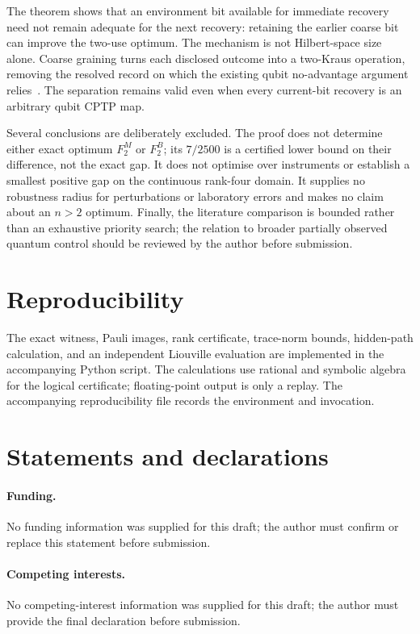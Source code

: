 \documentclass[11pt]{article}
\begin{document}
The theorem shows that an environment bit available for immediate recovery need not
remain adequate for the next recovery: retaining the earlier coarse bit can improve
the two-use optimum.  The mechanism is not Hilbert-space size alone.  Coarse graining
turns each disclosed outcome into a two-Kraus operation, removing the resolved record
on which the existing qubit no-advantage argument relies~\cite{GregorattiWerner2004,RexitiEtAl2024}.
The separation remains valid even when every current-bit recovery is an arbitrary
qubit CPTP map.

Several conclusions are deliberately excluded.  The proof does not determine either
exact optimum $F_2^M$ or $F_2^B$; its $7/2500$ is a certified lower bound on their
difference, not the exact gap.  It does not optimise over instruments or establish a
smallest positive gap on the continuous rank-four domain.  It supplies no robustness
radius for perturbations or laboratory errors and makes no claim about an $n>2$
optimum.  Finally, the literature comparison is bounded rather than an exhaustive
priority search; the relation to broader partially observed quantum control should be
reviewed by the author before submission.

\section*{Reproducibility}

The exact witness, Pauli images, rank certificate, trace-norm bounds, hidden-path
calculation, and an independent Liouville evaluation are implemented in the accompanying
Python script.  The calculations use rational and symbolic algebra for the logical
certificate; floating-point output is only a replay.  The accompanying reproducibility
file records the environment and invocation.

\section*{Statements and declarations}

\paragraph{Funding.} No funding information was supplied for this draft; the author
must confirm or replace this statement before submission.

\paragraph{Competing interests.} No competing-interest information was supplied for
this draft; the author must provide the final declaration before submission.
\end{document}
